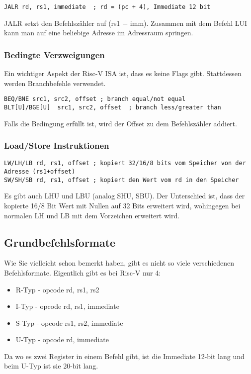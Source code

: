 \begin{lstlisting}[style=risc-v_Assembler]
JALR rd, rs1, immediate  ; rd = (pc + 4), Immediate 12 bit
\end{lstlisting}

JALR setzt den Befehlszähler auf (rs1 + imm). Zusammen mit dem Befehl LUI kann
man auf eine beliebige Adresse im Adressraum springen.

\subsubsection{Bedingte Verzweigungen}

Ein wichtiger Aspekt der Risc-V ISA ist, dass es keine Flags gibt. Stattdessen
werden Branchbefehle verwendet.

\begin{lstlisting}[style=risc-v_Assembler]
BEQ/BNE src1, src2, offset ; branch equal/not equal
BLT[U]/BGE[U]  src1, src2, offset  ; branch less/greater than
\end{lstlisting}

Falls die Bedingung erfüllt ist, wird der Offset zu dem Befehlszähler addiert.

\subsubsection{Load/Store Instruktionen}

\begin{lstlisting}[style=risc-v_Assembler]
LW/LH/LB rd, rs1, offset ; kopiert 32/16/8 bits vom Speicher von der Adresse (rs1+offset)
SW/SH/SB rd, rs1, offset ; kopiert den Wert vom rd in den Speicher
\end{lstlisting}

Es gibt auch LHU und LBU (analog SHU, SBU). Der Unterschied ist, dass der
kopierte 16/8 Bit Wert mit Nullen auf 32 Bits erweitert wird, wohingegen bei normalen LH
und LB mit dem Vorzeichen erweitert wird.

\subsection{Grundbefehlsformate}

Wie Sie vielleicht schon bemerkt haben, gibt es nicht so viele verschiedenen
Befehlsformate. Eigentlich gibt es bei Risc-V nur 4:

\begin{itemize}
\item R-Typ - opcode rd, rs1, rs2
\item I-Typ - opcode rd, rs1, immediate
\item S-Typ - opcode rs1, rs2, immediate
\item U-Typ - opcode rd, immediate
\end{itemize}

Da wo es zwei Register in einem Befehl gibt, ist die Immediate 12-bit lang und
beim U-Typ ist sie 20-bit lang.
